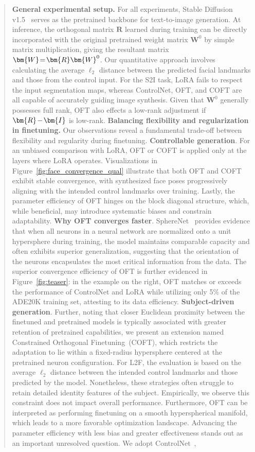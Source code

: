 \begin{itemize}[leftmargin=*,nosep]
\begin{abstract}
\textbf{General experimental setup.} For all experiments, Stable Diffusion v1.5~\cite{rombach2022high} serves as the pretrained backbone for text-to-image generation. At inference, the orthogonal matrix $\bm{R}$ learned during training can be directly incorporated with the original pretrained weight matrix $\bm{W}^0$ by simple matrix multiplication, giving the resultant matrix $\thickmuskip=2mu \medmuskip=2mu \bm{W}=\bm{R}\bm{W}^0$. Our quantitative approach involves calculating the average $\ell_2$ distance between the predicted facial landmarks and those from the control input. For the S2I task, LoRA fails to respect the input segmentation maps, whereas ControlNet, OFT, and COFT are all capable of accurately guiding image synthesis. Given that $\bm{W}^0$ generally possesses full rank, OFT also effects a low-rank adjustment if $\thickmuskip=2mu \medmuskip=2mu \bm{R}-\bm{I}$ is low-rank. \textbf{Balancing flexibility and regularization in finetuning.} Our observations reveal a fundamental trade-off between flexibility and regularity during finetuning. \textbf{Controllable generation}. For an unbiased comparison with LoRA, OFT or COFT is applied only at the layers where LoRA operates. Visualizations in Figure~\ref{fig:face_convergence_qual} illustrate that both OFT and COFT exhibit stable convergence, with synthesized face poses progressively aligning with the intended control landmarks over training. Lastly, the parameter efficiency of OFT hinges on the block diagonal structure, which, while beneficial, may introduce systematic biases and constrain adaptability. \textbf{Why OFT converges faster}. SphereNet~\cite{liu2017deep} provides evidence that when all neurons in a neural network are normalized onto a unit hypersphere during training, the model maintains comparable capacity and often exhibits superior generalization, suggesting that the orientation of the neurons encapsulates the most critical information from the data. The superior convergence efficiency of OFT is further evidenced in Figure~\ref{fig:teaser}: in the example on the right, OFT matches or exceeds the performance of ControlNet and LoRA while utilizing only 5\% of the ADE20K training set, attesting to its data efficiency. \textbf{Subject-driven generation}. Further, noting that closer Euclidean proximity between the finetuned and pretrained models is typically associated with greater retention of pretrained capabilities, we present an extension named Constrained Orthogonal Finetuning~(COFT), which restricts the adaptation to lie within a fixed-radius hypersphere centered at the pretrained neuron configuration. For L2F, the evaluation is based on the average $\ell_2$ distance between the intended control landmarks and those predicted by the model. Nonetheless, these strategies often struggle to retain detailed identity features of the subject. Empirically, we observe this constraint does not impact overall performance. Furthermore, OFT can be interpreted as performing finetuning on a smooth hyperspherical manifold, which leads to a more favorable optimization landscape. Advancing the parameter efficiency with less bias and greater effectiveness stands out as an important unresolved question. We adopt ControlNet~\cite{zhang2023adding}, 
\end{abstract}
\end{itemize}
